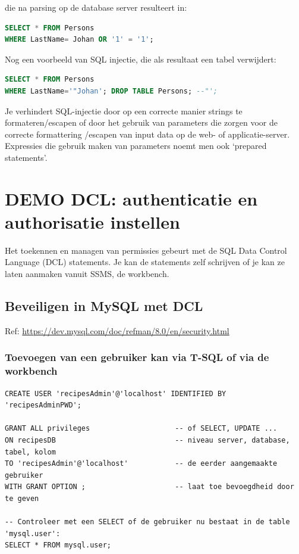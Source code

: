\documentclass{article}
\begin{document}
die na parsing op de database server resulteert in:

\begin{lstlisting}[language=SQL]
SELECT * FROM Persons
WHERE LastName= Johan OR '1' = '1';
\end{lstlisting}

Nog een voorbeeld van SQL injectie, die als resultaat een tabel verwijdert:

\begin{lstlisting}[language=SQL]
SELECT * FROM Persons
WHERE LastName='"Johan'; DROP TABLE Persons; --"';
\end{lstlisting}

Je verhindert SQL-injectie door op een correcte manier strings te formateren/escapen
of door het gebruik van parameters die zorgen voor de correcte formattering /escapen van input data op de web-
of applicatie-server. Expressies die gebruik maken van parameters noemt men ook ‘prepared statements’.

\section{DEMO DCL: authenticatie en authorisatie instellen}
Het toekennen en managen van permissies gebeurt met de SQL Data Control Language (DCL) statements. Je kan de
statements zelf schrijven of je kan ze laten aanmaken vanuit SSMS, de workbench.

\subsection{Beveiligen in MySQL met DCL}
Ref: \url{https://dev.mysql.com/doc/refman/8.0/en/security.html}

\subsubsection{Toevoegen van een gebruiker kan via T-SQL of via de workbench}

\begin{lstlisting}
CREATE USER 'recipesAdmin'@'localhost' IDENTIFIED BY 'recipesAdminPWD';

GRANT ALL privileges                    -- of SELECT, UPDATE ...
ON recipesDB                            -- niveau server, database, tabel, kolom
TO 'recipesAdmin'@'localhost'           -- de eerder aangemaakte gebruiker
WITH GRANT OPTION ;                     -- laat toe bevoegdheid door te geven

-- Controleer met een SELECT of de gebruiker nu bestaat in de table 'mysql.user':
SELECT * FROM mysql.user;
\end{lstlisting}
\end{document}
